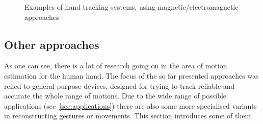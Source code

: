 \begin{figure}[h]
	\hfill
	
	\caption{Examples of hand tracking systems, using magnetic/electromagnetic approaches}
	\label{fig:examplesMagnetic}
\end{figure}


\subsection{Other approaches} \label{subsec:approaches:other}
As one can see, there is a lot of research going on in the area of motion estimation for the human hand. The focus of the so far presented approaches was relied to general purpose devices, designed for trying to track reliable and accurate the whole range of motions. Due to the wide range of possible applications (see~\ref{sec:applications}) there are also some more specialised variants in reconstructing gestures or movements. This section introduces some of them.

